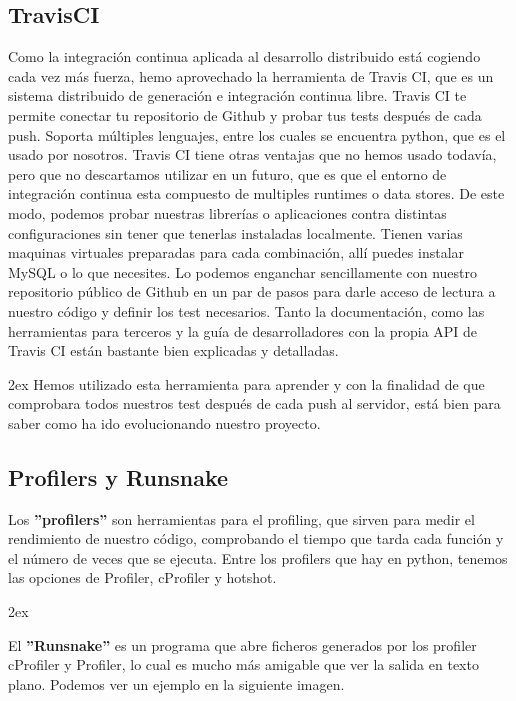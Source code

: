 \documentclass[12pt,a4paper]{report}
\begin{document}
\subsection{TravisCI}

Como la integración continua aplicada al desarrollo distribuido está cogiendo
cada vez más fuerza, hemo aprovechado la herramienta de Travis CI, que es un
sistema distribuido de generación e integración continua libre.
Travis CI te permite conectar tu repositorio de Github y probar tus tests
después de cada push. Soporta múltiples lenguajes, entre los cuales se encuentra
python, que es el usado por nosotros.
Travis CI tiene otras ventajas que no hemos usado todavía, pero que no
descartamos utilizar en un futuro, que es que el entorno de integración continua
esta compuesto de multiples runtimes o data stores. De este modo, podemos probar
nuestras librerías o aplicaciones contra distintas configuraciones sin tener que
tenerlas instaladas localmente. Tienen varias maquinas virtuales preparadas para
cada combinación, allí puedes instalar MySQL o lo que necesites.
Lo podemos enganchar sencillamente con nuestro repositorio público de Github en
un par de pasos para darle acceso de lectura a nuestro código y definir los test
necesarios. Tanto la documentación, como las herramientas para terceros y la
guía de desarrolladores con la propia API de Travis CI están bastante bien
explicadas y detalladas. 

\parskip 2ex
Hemos utilizado esta herramienta para aprender y con la finalidad de que
comprobara todos nuestros test después de cada push al servidor, está bien para
saber como ha ido evolucionando nuestro proyecto. 


\subsection{Profilers y Runsnake}

Los \textbf{''profilers''} son herramientas para el profiling, que sirven para
medir el rendimiento de nuestro código, comprobando el tiempo que tarda cada
función y el número de veces que se ejecuta. Entre los profilers que hay en
python, tenemos las opciones de Profiler, cProfiler y hotshot.

\parskip 2ex

El \textbf{''Runsnake''} es un programa que abre ficheros
generados por los profiler cProfiler y Profiler, lo cual es mucho más amigable
que ver la salida en texto plano. Podemos ver un ejemplo en la siguiente imagen. 
\end{document}
